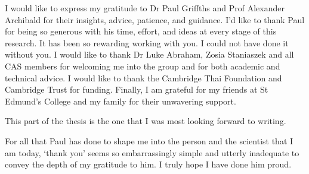 
\begin{acknowledgements}      



I would like to express my gratitude to Dr Paul Griffths and Prof Alexander Archibald for their insights, advice, patience, and guidance. I’d like to thank Paul for being so generous with his time, effort, and ideas at every stage of this research. It has been so rewarding working with you. I could not have done it without you. I would like to thank Dr Luke Abraham, Zosia Staniaszek and all CAS members for welcoming me into the group and for both academic and technical advice. I would like to thank the Cambridge Thai Foundation and Cambridge Trust for funding. Finally, I am grateful for my friends at St Edmund’s College and my family for their unwavering support.


This part of the thesis is the one that I was most looking forward to writing.

For all that Paul has done to shape me into the person and the scientist that I am today, ‘thank you’ seems so embarrassingly simple and utterly inadequate to convey the depth of my gratitude to him. I truly hope I have done him proud.

\end{acknowledgements}
